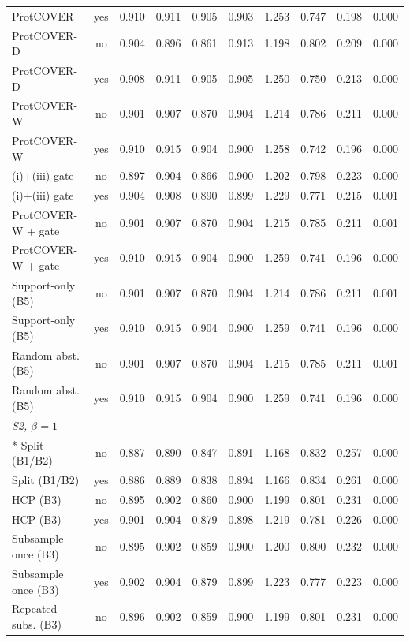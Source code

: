 \begin{longtable}{lccccccccc}
ProtCOVER & yes & 0.910 & 0.911 & 0.905 & 0.903 & 1.253 & 0.747 & 0.198 & 0.000 \\
ProtCOVER-D & no & 0.904 & 0.896 & 0.861 & 0.913 & 1.198 & 0.802 & 0.209 & 0.000 \\
ProtCOVER-D & yes & 0.908 & 0.911 & 0.905 & 0.905 & 1.250 & 0.750 & 0.213 & 0.000 \\
ProtCOVER-W & no & 0.901 & 0.907 & 0.870 & 0.904 & 1.214 & 0.786 & 0.211 & 0.000 \\
ProtCOVER-W & yes & 0.910 & 0.915 & 0.904 & 0.900 & 1.258 & 0.742 & 0.196 & 0.000 \\
(i)+(iii) gate & no & 0.897 & 0.904 & 0.866 & 0.900 & 1.202 & 0.798 & 0.223 & 0.000 \\
(i)+(iii) gate & yes & 0.904 & 0.908 & 0.890 & 0.899 & 1.229 & 0.771 & 0.215 & 0.001 \\
ProtCOVER-W + gate & no & 0.901 & 0.907 & 0.870 & 0.904 & 1.215 & 0.785 & 0.211 & 0.001 \\
ProtCOVER-W + gate & yes & 0.910 & 0.915 & 0.904 & 0.900 & 1.259 & 0.741 & 0.196 & 0.000 \\
Support-only (B5) & no & 0.901 & 0.907 & 0.870 & 0.904 & 1.214 & 0.786 & 0.211 & 0.001 \\
Support-only (B5) & yes & 0.910 & 0.915 & 0.904 & 0.900 & 1.259 & 0.741 & 0.196 & 0.000 \\
Random abst. (B5) & no & 0.901 & 0.907 & 0.870 & 0.904 & 1.215 & 0.785 & 0.211 & 0.001 \\
Random abst. (B5) & yes & 0.910 & 0.915 & 0.904 & 0.900 & 1.259 & 0.741 & 0.196 & 0.000 \\
\midrule
\multicolumn{10}{l}{\emph{S2, $\beta=1$}}\\*
Split (B1/B2) & no & 0.887 & 0.890 & 0.847 & 0.891 & 1.168 & 0.832 & 0.257 & 0.000 \\
Split (B1/B2) & yes & 0.886 & 0.889 & 0.838 & 0.894 & 1.166 & 0.834 & 0.261 & 0.000 \\
HCP (B3) & no & 0.895 & 0.902 & 0.860 & 0.900 & 1.199 & 0.801 & 0.231 & 0.000 \\
HCP (B3) & yes & 0.901 & 0.904 & 0.879 & 0.898 & 1.219 & 0.781 & 0.226 & 0.000 \\
Subsample once (B3) & no & 0.895 & 0.902 & 0.859 & 0.900 & 1.200 & 0.800 & 0.232 & 0.000 \\
Subsample once (B3) & yes & 0.902 & 0.904 & 0.879 & 0.899 & 1.223 & 0.777 & 0.223 & 0.000 \\
Repeated subs. (B3) & no & 0.896 & 0.902 & 0.859 & 0.900 & 1.199 & 0.801 & 0.231 & 0.000 \\

\end{longtable}
